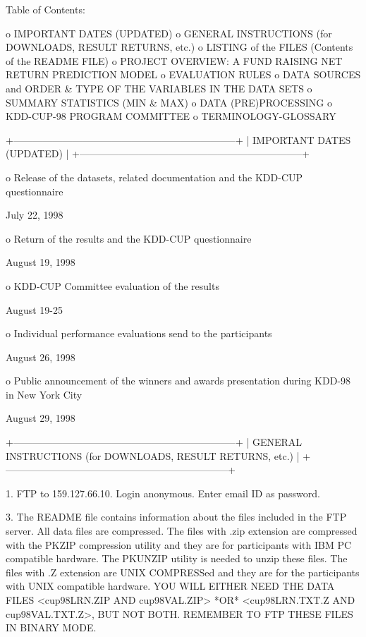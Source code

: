 \documentclass[
  11pt,
  a4paper,
  DIV=12,captions=tableheading,oneside,titlepage]{scrbook}
\let\oldverbatim\verbatim
\let\endoldverbatim\endverbatim
\renewenvironment{verbatim}{\footnotesize\oldverbatim}{\endoldverbatim}
\begin{document}
\begin{verbatim}
Table of Contents:       

o IMPORTANT DATES (UPDATED)
o GENERAL INSTRUCTIONS (for DOWNLOADS, RESULT RETURNS, etc.)
o LISTING of the FILES (Contents of the README FILE)
o PROJECT OVERVIEW: A FUND RAISING NET RETURN PREDICTION MODEL
o EVALUATION RULES 
o DATA SOURCES and ORDER & TYPE OF THE VARIABLES IN THE DATA SETS 
o SUMMARY STATISTICS (MIN & MAX)
o DATA (PRE)PROCESSING
o KDD-CUP-98 PROGRAM COMMITTEE
o TERMINOLOGY-GLOSSARY


+--------------------------------------------------------------------+
| IMPORTANT DATES (UPDATED)                                          |
+--------------------------------------------------------------------+

o Release of the datasets, related documentation and the KDD-CUP
  questionnaire

  July 22, 1998

o Return of the results and the KDD-CUP questionnaire  

  August 19, 1998

o KDD-CUP Committee evaluation of the results

  August 19-25

o Individual performance evaluations send to the participants

  August 26, 1998
 
o Public announcement of the winners and awards presentation during
  KDD-98 in New York City

  August 29, 1998 


+--------------------------------------------------------------------+
| GENERAL INSTRUCTIONS (for DOWNLOADS, RESULT RETURNS, etc.)         | 
+--------------------------------------------------------------------+

1. FTP to 159.127.66.10. Login anonymous. Enter email ID as password.

3. The README file contains information about the files included in
the FTP server.  All data files are compressed. The files with .zip
extension are compressed with the PKZIP compression utility and they
are for participants with IBM PC compatible hardware. The PKUNZIP
utility is needed to unzip these files. The files with .Z extension
are UNIX COMPRESSed and they are for the participants with UNIX
compatible hardware. YOU WILL EITHER NEED THE DATA FILES <cup98LRN.ZIP
AND cup98VAL.ZIP> *OR* <cup98LRN.TXT.Z AND cup98VAL.TXT.Z>, BUT NOT
BOTH. REMEMBER TO FTP THESE FILES IN BINARY MODE.


\end{verbatim}
\end{document}
